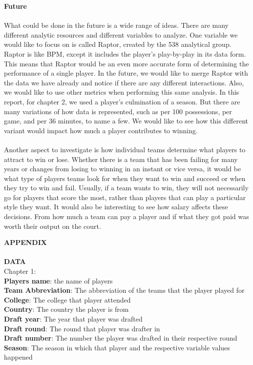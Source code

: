\documentclass[11pt,letterpaper]{amsart}
\begin{document}
\newpage
\noindent \textbf{Future}\\\\
\indent What could be done in the future is a wide range of ideas. There are many different analytic resources and different variables to analyze. One variable we would like to focus on is called Raptor, created by the 538 analytical group. Raptor is like BPM, except it includes the player’s play-by-play in its data form. This means that Raptor would be an even more accurate form of determining the performance of a single player. In the future, we would like to merge Raptor with the data we have already and notice if there are any different interactions. Also, we would like to use other metrics when performing this same analysis. In this report, for chapter 2, we used a player’s culmination of a season. But there are many variations of how data is represented, such as per 100 possessions, per game, and per 36 minutes, to name a few. We would like to see how this different variant would impact how much a player contributes to winning.\\\\
\indent Another aspect to investigate is how individual teams determine what players to attract to win or lose. Whether there is a team that has been failing for many years or changes from losing to winning in an instant or vice versa, it would be what type of players teams look for when they want to win and succeed or when they try to win and fail. Usually, if a team wants to win, they will not necessarily go for players that score the most, rather than players that can play a particular style they want. It would also be interesting to see how salary affects these decisions. From how much a team can pay a player and if what they got paid was worth their output on the court.

\newpage



\newpage \noindent \textbf{APPENDIX}\\\\
\textbf{DATA}\\
\noindent Chapter 1:\\
\textbf{Players name}: the name of players\\
\textbf{Team Abbreviation}: The abbreviation of the teams that the player played for\\
\textbf{College}: The college that player attended\\
\textbf{Country}: The country the player is from\\
\textbf{Draft year}: The year that player was drafted\\
\textbf{Draft round}: The round that player was drafter in\\
\textbf{Draft number}: The number the player was drafted in their respective round\\
\textbf{Season}: The season in which that player and the respective variable values happened\\
\end{document}
